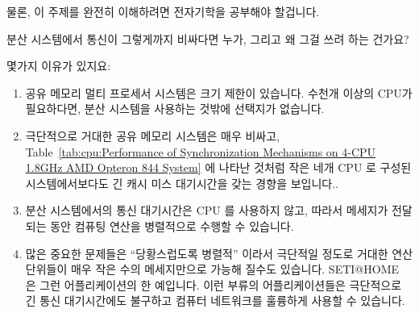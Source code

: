 \begin{enumerate}
	물론, 이 주제를 완전히 이해하려면 전자기학을 공부해야 할겁니다.

\QuickQ{}
	분산 시스템에서 통신이 그렇게까지 비싸다면 누가, 그리고 왜 그걸 쓰려
	하는 건가요?

\QuickA{}
	몇가지 이유가 있지요:

	\begin{enumerate}
	\item	공유 메모리 멀티 프로세서 시스템은 크기 제한이 있습니다.
		수천개 이상의 CPU가 필요하다면, 분산 시스템을 사용하는 것밖에
		선택지가 없습니다.
	\item	극단적으로 거대한 공유 메모리 시스템은 매우 비싸고,
		Table~\ref{tab:cpu:Performance of Synchronization Mechanisms on
		4-CPU 1.8GHz AMD Opteron 844 System} 에 나타난 것처럼 작은 네개
		CPU 로 구성된 시스템에서보다도 긴 캐시 미스 대기시간을 갖는
		경향을 보입니다..
	\item	분산 시스템에서의 통신 대기시간은 CPU 를 사용하지 않고, 따라서
		메세지가 전달되는 동안 컴퓨팅 연산을 병렬적으로 수행할 수
		있습니다.
	\item	많은 중요한 문제들은 ``당황스럽도록 병렬적'' 이라서 극단적일
		정도로 거대한 연산 단위들이 매우 작은 수의 메세지만으로 가능해
		질수도 있습니다.
		SETI@HOME~\cite{SETIatHOME2008} 은 그런 어플리케이션의 한
		예입니다.
		이런 부류의 어플리케이션들은 극단적으로 긴 통신 대기시간에도
		불구하고 컴퓨터 네트워크를 훌륭하게 사용할 수 있습니다.

	\end{enumerate}


\end{enumerate}
